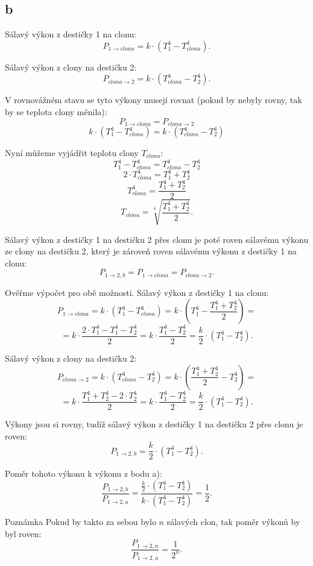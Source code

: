 \documentclass{article}
\begin{document}
\subsection{b}
Sálavý výkon z destičky 1 na clonu:
$$
    P_{1 \rightarrow clona} = k \cdot \left( T_1^4 - T_{clona}^4 \right).
$$

Sálavý výkon z clony na destičku 2:
$$
    P_{clona \rightarrow 2} = k \cdot \left( T_{clona}^4 - T_2^4 \right).
$$

V rovnovážném stavu se tyto výkony musejí rovnat (pokud by nebyly rovny, tak by se teplota clony měnila):
$$
    P_{1 \rightarrow clona} = P_{clona \rightarrow 2}
$$
$$
    k \cdot \left( T_1^4 - T_{clona}^4 \right) = k \cdot \left( T_{clona}^4 - T_2^4 \right)
$$

Nyní můžeme vyjádřit teplotu clony $T_{clona}$:
$$
    T_1^4 - T_{clona}^4 = T_{clona}^4 - T_2^4
$$
$$
    2 \cdot T_{clona}^4 = T_1^4 + T_2^4
$$
$$
    T_{clona}^4 = \frac{T_1^4 + T_2^4}{2}
$$
$$
    T_{clona} = \sqrt[4]{\frac{T_1^4 + T_2^4}{2}}.
$$

Sálavý výkon z destičky 1 na destičku 2 přes clonu je poté roven sálavému výkonu ze clony na destičku 2, který je zároveň roven sálavému výkonu z destičky 1 na clonu:
$$
    P_{1 \rightarrow 2,b} = P_{1 \rightarrow clona} = P_{clona \rightarrow 2}.
$$

Ověřme výpočet pro obě možnosti. Sálavý výkon z destičky 1 na clonu:
$$
    P_{1 \rightarrow clona} = k \cdot \left( T_1^4 - T_{clona}^4 \right) = k \cdot \left( T_1^4 - \frac{T_1^4 + T_2^4}{2} \right) =
$$
$$
    = k \cdot \frac{2 \cdot T_1^4 - T_1^4 - T_2^4}{2} = k \cdot \frac{T_1^4 - T_2^4}{2} = \frac{k}{2} \cdot \left( T_1^4 - T_2^4 \right).
$$

Sálavý výkon z clony na destičku 2:
$$
    P_{clona \rightarrow 2} = k \cdot \left( T_{clona}^4 - T_2^4 \right) = k \cdot \left( \frac{T_1^4 + T_2^4}{2} - T_2^4 \right) =
$$
$$
    = k \cdot \frac{T_1^4 + T_2^4 - 2 \cdot T_2^4}{2} = k \cdot \frac{T_1^4 - T_2^4}{2} = \frac{k}{2} \cdot \left( T_1^4 - T_2^4 \right).
$$

Výkony jsou si rovny, tudíž sálavý výkon z destičky 1 na destičku 2 přes clonu je roven:
$$
    P_{1 \rightarrow 2,b} = \frac{k}{2} \cdot \left( T_1^4 - T_2^4 \right).
$$

Poměr tohoto výkonu k výkonu z bodu a):
$$
    \frac{P_{1 \rightarrow 2,b}}{P_{1 \rightarrow 2,a}} = \frac{\frac{k}{2} \cdot \left( T_1^4 - T_2^4 \right)}{k \cdot \left( T_1^4 - T_2^4 \right)} = \frac{1}{2}.
$$

\begin{notebox}{Poznámka}
    Pokud by takto za sebou bylo $n$ sálavých clon, tak poměr výkonů by byl roven:
    $$
        \frac{P_{1 \rightarrow 2,n}}{P_{1 \rightarrow 2,a}} = \frac{1}{2^n}.
    $$
\end{notebox}
\end{document}

